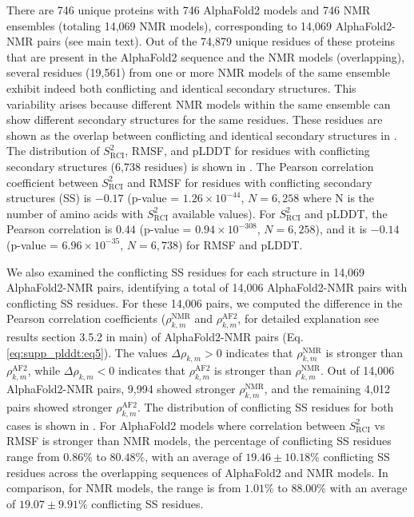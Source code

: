 There are 746 unique proteins with 746 AlphaFold2 models and 746 NMR ensembles (totaling 14,069 NMR models), corresponding to 14,069 AlphaFold2-NMR pairs (see main text). Out of the 74,879 unique residues of these proteins that are present in the AlphaFold2 sequence and the NMR models (overlapping), several residues (19,561) from one or more NMR models of the same ensemble exhibit indeed both conflicting and identical secondary structures. This variability arises because different NMR models within the same ensemble can show different secondary structures for the same residues. These residues are shown as the overlap between conflicting and identical secondary structures in . The distribution of $S^2_{\text{RCI}}$, RMSF, and pLDDT for residues with conflicting secondary structures (6,738 residues) is shown in . The Pearson correlation coefficient between $S^2_{\text{RCI}}$ and RMSF for residues with conflicting secondary structures (SS) is $-0.17$ (p-value = $1.26 \times 10^{-44}$, $N=6,258$ where N is the number of amino acids with $S^2_{\text{RCI}}$ available values). For $S^2_{\text{RCI}}$ and pLDDT, the Pearson correlation is $0.44$ (p-value = $0.94 \times 10^{-308}$, $N=6,258$), and it is $-0.14$ (p-value = $6.96 \times 10^{-35}$, $N= 6,738$) for RMSF and pLDDT.

We also examined the conflicting SS residues for each structure in 14,069 AlphaFold2-NMR pairs, identifying a total of 14,006 AlphaFold2-NMR pairs with conflicting SS residues. For these 14,006 pairs, we computed the difference in the Pearson correlation coefficients ($\rho_{k,m}^{\text{NMR}}$ and $\rho_{k,m}^{\text{AF2}}$, for detailed explanation see results section 3.5.2 in main) of AlphaFold2-NMR pairs (Eq. \ref{eq:supp_plddt:eq5}). The values $\Delta \rho_{k,m} > 0$ indicates that $\rho_{k,m}^{\text{NMR}}$ is stronger than $\rho_{k,m}^{\text{AF2}}$, while $\Delta \rho_{k,m} < 0$ indicates that $\rho_{k,m}^{\text{AF2}}$ is stronger than $\rho_{k,m}^{\text{NMR}}$. Out of 14,006 AlphaFold2-NMR pairs, 9,994 showed stronger $\rho_{k,m}^{\text{NMR}}$, and the remaining 4,012 pairs showed stronger $\rho_{k,m}^{\text{AF2}}$. The distribution of conflicting SS residues for both cases is shown in . For AlphaFold2 models where correlation between $S^2_{\text{RCI}}$ vs RMSF is stronger than NMR models, the percentage of conflicting SS residues range from $0.86\%$ to $80.48\%$, with an average of $19.46 \pm 10.18\%$ conflicting SS residues across the overlapping sequences of AlphaFold2 and NMR models. In comparison, for NMR models, the range is from $1.01\%$ to $88.00\%$ with an average of $19.07 \pm 9.91\%$ conflicting SS residues. 

